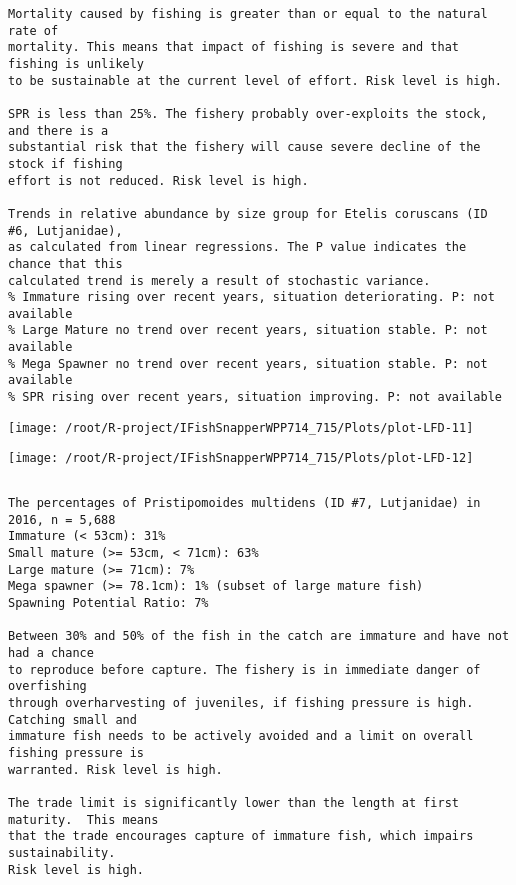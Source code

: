 \documentclass{report}\usepackage[]{graphicx}\usepackage[]{color}
\makeatletter
\def\maxwidth{ %
  \ifdim\Gin@nat@width>\linewidth
    \linewidth
  \else
    \Gin@nat@width
  \fi
}
\newenvironment{kframe}{%
 \def\at@end@of@kframe{}%
 \ifinner\ifhmode%
  \def\at@end@of@kframe{\end{minipage}}%
  \begin{minipage}{\columnwidth}%
 \fi\fi%
 \def\FrameCommand##1{\hskip\@totalleftmargin \hskip-\fboxsep
 \colorbox{shadecolor}{##1}\hskip-\fboxsep
     \hskip-\linewidth \hskip-\@totalleftmargin \hskip\columnwidth}%
 \MakeFramed {\advance\hsize-\width
   \@totalleftmargin\z@ \linewidth\hsize
   \@setminipage}}%
 {\par\unskip\endMakeFramed%
 \at@end@of@kframe}
\newenvironment{knitrout}{}{} %
\makeatother
\begin{document}
\begin{knitrout}
\begin{kframe}
\begin{verbatim}
Mortality caused by fishing is greater than or equal to the natural rate of
mortality. This means that impact of fishing is severe and that fishing is unlikely
to be sustainable at the current level of effort. Risk level is high.
 
SPR is less than 25%. The fishery probably over-exploits the stock, and there is a
substantial risk that the fishery will cause severe decline of the stock if fishing
effort is not reduced. Risk level is high.
 
Trends in relative abundance by size group for Etelis coruscans (ID #6, Lutjanidae),
as calculated from linear regressions. The P value indicates the chance that this
calculated trend is merely a result of stochastic variance.
% Immature rising over recent years, situation deteriorating. P: not available
% Large Mature no trend over recent years, situation stable. P: not available
% Mega Spawner no trend over recent years, situation stable. P: not available
% SPR rising over recent years, situation improving. P: not available
\end{verbatim}
\end{kframe}
\texttt{[image: /root/R-project/IFishSnapperWPP714\_715/Plots/plot-LFD-11]} 

\texttt{[image: /root/R-project/IFishSnapperWPP714\_715/Plots/plot-LFD-12]} 
\begin{kframe}\begin{verbatim}
\end{verbatim}
\end{kframe}
\clearpage
\newpage
\begin{kframe}\begin{verbatim}The percentages of Pristipomoides multidens (ID #7, Lutjanidae) in 2016, n = 5,688
Immature (< 53cm): 31%
Small mature (>= 53cm, < 71cm): 63%
Large mature (>= 71cm): 7%
Mega spawner (>= 78.1cm): 1% (subset of large mature fish)
Spawning Potential Ratio: 7%
 
Between 30% and 50% of the fish in the catch are immature and have not had a chance
to reproduce before capture. The fishery is in immediate danger of overfishing
through overharvesting of juveniles, if fishing pressure is high.  Catching small and
immature fish needs to be actively avoided and a limit on overall fishing pressure is
warranted. Risk level is high.

The trade limit is significantly lower than the length at first maturity.  This means
that the trade encourages capture of immature fish, which impairs sustainability.
Risk level is high.


\end{verbatim}
\end{kframe}
\end{knitrout}
\end{document}
